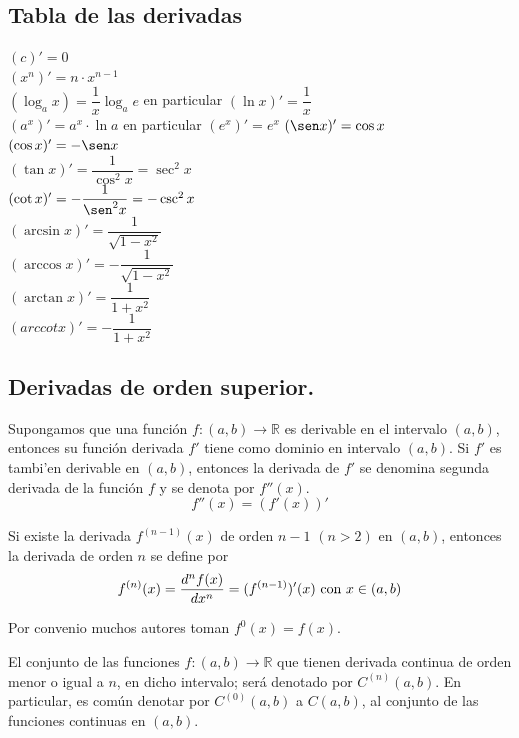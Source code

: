 \documentclass[10pt,twoside]{SelfArx} %
\begin{document}
\subsection{Tabla de las derivadas}
$ (c)'=0 $\\
$ (x^{n})'=n\cdot x^{n-1} $\\
$ (\log_{a}x)=\dfrac{1}{x}\log_{a}e $ en particular $ (\ln x)'= \dfrac{1}{x} $\\
$ (a^{x})'=a^{x}\cdot\ln a $ en particular  $ (e^{x})'=e^{x} $
$ (\sen x)'=\cos x $\\
$ (\cos x)'=-\sen x $\\
$ (\tan x)'=\dfrac{1}{\cos^{2} x}=\sec^{2}x $\\
$ (\cot x)'=-\dfrac{1}{\sen^{2}x}=-\csc^{2}x $\\
$ (\arcsin x)'=\dfrac{1}{\sqrt{1-x^{2}}} $\\
$ (\arccos x)'=-\dfrac{1}{\sqrt{1-x^{2}}} $\\
$ (\arctan x)'=\dfrac{1}{1+x^{2}} $\\
$ (arccot x)'=-\dfrac{1}{1+x^{2}} $\\



\subsection{Derivadas de orden superior.}
Supongamos que una funci\'on $ f:(a,b)\rightarrow\mathbb{R} $ es derivable en el intervalo $ (a,b) $, entonces su función derivada $ f' $ tiene como dominio en intervalo $ (a,b) $.
Si $ f' $ es tambi'en derivable en $ (a,b) $, entonces la derivada de $ f' $ se denomina segunda derivada de la función $ f $ y se denota por $ f''(x) $.
\[ f''(x)=(f'(x))' \]
\begin{thm}
	Si existe la derivada $ f^{(n-1)}(x) $ de orden $ n-1 $ $ (n>2) $ en $ (a,b) $, entonces la derivada de orden $ n $ se define por
	\begin{equation}
	f^{(n)}(x)=\dfrac{d^{n}f(x)}{dx^{n}}=(f^{(n-1)})'(x)  \hbox{ con $x\in(a,b)  $}
	\end{equation}
\end{thm}
Por convenio muchos autores toman $ f^{0}(x)=f(x) $.\\
\begin{thm}
El conjunto de las funciones $ f:(a,b)\rightarrow\mathbb{R} $ que tienen \textsf{derivada continua de orden menor o igual a $ n $}, en dicho intervalo; ser\'a denotado por $ C^{(n)}(a,b) $. En particular, es com\'un denotar por $ C^{(0)}(a,b) $ a $ C(a,b) $, al conjunto de las funciones continuas en $ (a,b) $.
\end{thm}
\end{document}
